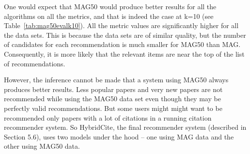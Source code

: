 One would expect that MAG50 would produce better results for all the algorithms on all the metrics, and that is indeed the case at k=10 (see Table~\ref{tab:mag50evalk10}). All the metric values are significantly higher for all the data sets. This is because the data sets are of similar quality, but the number of candidates for each recommendation is much smaller for MAG50 than MAG. Consequently, it is more likely that the relevant items are near the top of the list of recommendations.  

However, the inference cannot be made that a system using MAG50 always produces better results. Less popular papers and very new papers are not recommended while using the MAG50 data set even though they may be perfectly valid recommendations. But some users might might want to be recommended only papers with a lot of citations in a running citation recommender system. So HybridCite, the final recommender system (described in Section 5.6), uses two models under the hood -- one using MAG data and the other using MAG50 data. 
